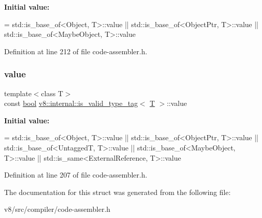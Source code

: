 {\bfseries Initial value\+:}
\begin{DoxyCode}
= std::is\_base\_of<Object, T>::value ||
                                std::is\_base\_of<ObjectPtr, T>::value ||
                                std::is\_base\_of<MaybeObject, T>::value
\end{DoxyCode}


Definition at line 212 of file code-\/assembler.\+h.

\mbox{\label{structv8_1_1internal_1_1is__valid__type__tag_a170297a66df8a84ee2828b7c2820bbb2}} 
\subsubsection{\texorpdfstring{value}{value}}
{\footnotesize\ttfamily template$<$class T$>$ \\
const \mbox{\hyperlink{classbool}{bool}} \mbox{\hyperlink{structv8_1_1internal_1_1is__valid__type__tag}{v8\+::internal\+::is\+\_\+valid\+\_\+type\+\_\+tag}}$<$ \mbox{\hyperlink{classv8_1_1internal_1_1torque_1_1T}{T}} $>$\+::value\hspace{0.3cm}{\ttfamily [static]}}

{\bfseries Initial value\+:}
\begin{DoxyCode}
= std::is\_base\_of<Object, T>::value ||
                            std::is\_base\_of<ObjectPtr, T>::value ||
                            std::is\_base\_of<UntaggedT, T>::value ||
                            std::is\_base\_of<MaybeObject, T>::value ||
                            std::is\_same<ExternalReference, T>::value
\end{DoxyCode}


Definition at line 207 of file code-\/assembler.\+h.



The documentation for this struct was generated from the following file\+:\begin{DoxyCompactItemize}
\item 
v8/src/compiler/code-\/assembler.\+h\end{DoxyCompactItemize}
